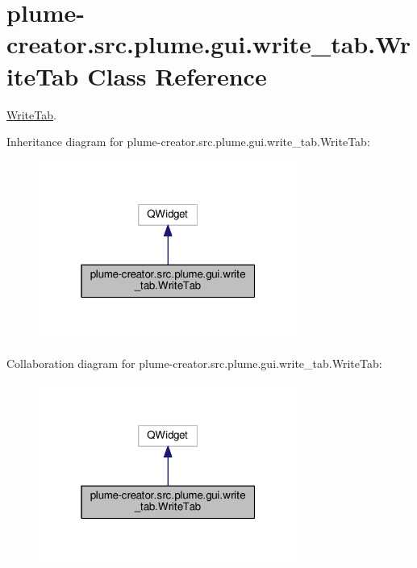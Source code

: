 \hypertarget{classplume-creator_1_1src_1_1plume_1_1gui_1_1write__tab_1_1_write_tab}{}\section{plume-\/creator.src.\+plume.\+gui.\+write\+\_\+tab.\+Write\+Tab Class Reference}
\label{classplume-creator_1_1src_1_1plume_1_1gui_1_1write__tab_1_1_write_tab}


\hyperlink{classplume-creator_1_1src_1_1plume_1_1gui_1_1write__tab_1_1_write_tab}{Write\+Tab}.  




Inheritance diagram for plume-\/creator.src.\+plume.\+gui.\+write\+\_\+tab.\+Write\+Tab\+:\nopagebreak
\begin{figure}[H]
\begin{center}
\leavevmode
\includegraphics[width=241pt]{classplume-creator_1_1src_1_1plume_1_1gui_1_1write__tab_1_1_write_tab__inherit__graph}
\end{center}
\end{figure}


Collaboration diagram for plume-\/creator.src.\+plume.\+gui.\+write\+\_\+tab.\+Write\+Tab\+:\nopagebreak
\begin{figure}[H]
\begin{center}
\leavevmode
\includegraphics[width=241pt]{classplume-creator_1_1src_1_1plume_1_1gui_1_1write__tab_1_1_write_tab__coll__graph}
\end{center}
\end{figure}
